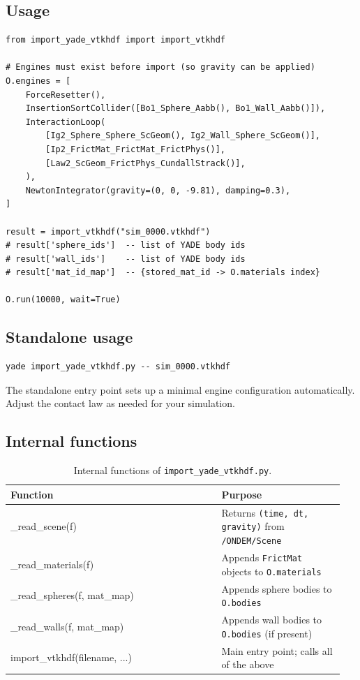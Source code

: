 \documentclass[11pt,a4paper]{article}
\begin{document}
\subsection{Usage}

\begin{lstlisting}
from import_yade_vtkhdf import import_vtkhdf

# Engines must exist before import (so gravity can be applied)
O.engines = [
    ForceResetter(),
    InsertionSortCollider([Bo1_Sphere_Aabb(), Bo1_Wall_Aabb()]),
    InteractionLoop(
        [Ig2_Sphere_Sphere_ScGeom(), Ig2_Wall_Sphere_ScGeom()],
        [Ip2_FrictMat_FrictMat_FrictPhys()],
        [Law2_ScGeom_FrictPhys_CundallStrack()],
    ),
    NewtonIntegrator(gravity=(0, 0, -9.81), damping=0.3),
]

result = import_vtkhdf("sim_0000.vtkhdf")
# result['sphere_ids']  -- list of YADE body ids
# result['wall_ids']    -- list of YADE body ids
# result['mat_id_map']  -- {stored_mat_id -> O.materials index}

O.run(10000, wait=True)
\end{lstlisting}

\subsection{Standalone usage}

\begin{lstlisting}[style=bash]
yade import_yade_vtkhdf.py -- sim_0000.vtkhdf
\end{lstlisting}

The standalone entry point sets up a minimal engine configuration
automatically. Adjust the contact law as needed for your simulation.

\subsection{Internal functions}

\begin{table}[htbp]
\centering
\begin{tabularx}{\textwidth}{>{\ttfamily\small\raggedright\arraybackslash}p{0.60\linewidth}>{\small\raggedright\arraybackslash}p{0.35\linewidth}}
\toprule
\sffamily\textbf{Function} & \sffamily\textbf{Purpose} \\
\midrule
\_read\_scene(f)              & Returns \texttt{(time, dt, gravity)} from \texttt{/ONDEM/Scene} \\
\_read\_materials(f)          & Appends \texttt{FrictMat} objects to \texttt{O.materials} \\
\_read\_spheres(f, mat\_map)  & Appends sphere bodies to \texttt{O.bodies} \\
\_read\_walls(f, mat\_map)    & Appends wall bodies to \texttt{O.bodies} (if present) \\
import\_vtkhdf(filename, ...) & Main entry point; calls all of the above \\
\bottomrule
\end{tabularx}
\caption{Internal functions of \texttt{import\_yade\_vtkhdf.py}.}
\end{table}
\end{document}
